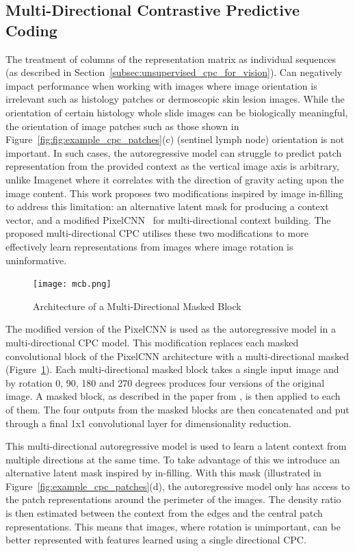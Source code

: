 \subsection{Multi-Directional Contrastive Predictive Coding}
\label{subsec:unsupervised_mdcpc}
The treatment of columns of the representation matrix as individual sequences (as described in Section~\ref{subsec:unsupervised_cpc_for_vision}). Can negatively impact performance when working with images where image orientation is irrelevant such as histology patches or dermoscopic skin lesion images. While the orientation of certain histology whole slide images can be biologically meaningful, the orientation of image patches such as those shown in Figure~\ref{fig:fig:example_cpc_patches}(c) (sentinel lymph node) orientation is not important. In such cases, the autoregressive model can struggle to predict patch representation from the provided context as the vertical image axis is arbitrary, unlike Imagenet where it correlates with the direction of gravity acting upon the image content. This work proposes two modifications inspired by image in-filling to address this limitation: an alternative latent mask for producing a context vector, and a modified PixelCNN~\citep{oord2016pixel} for multi-directional context building. The proposed multi-directional CPC utilises these two modifications to more effectively learn representations from images where image rotation is uninformative.

\begin{figure}
	\centering
	\texttt{[image: mcb.png]}
	\caption{Architecture of a Multi-Directional Masked Block}
	\label{fig:multi-directional_masked_block}
\end{figure}

The modified version of the PixelCNN is used as the autoregressive model in a multi-directional CPC model. This modification replaces each masked convolutional block of the PixelCNN architecture with a multi-directional masked (Figure~\ref{fig:multi-directional_masked_block}). Each multi-directional masked block takes a single input image and by rotation 0, 90, 180 and 270 degrees produces four versions of the original image. A masked block, as described in the paper from \cite{oord2016pixel}, is then applied to each of them. The four outputs from the masked blocks are then concatenated and put through a final 1x1 convolutional layer for dimensionality reduction.

This multi-directional autoregressive model is used to learn a latent context from multiple directions at the same time. To take advantage of this we introduce an alternative latent mask inspired by in-filling. With this mask (illustrated in Figure~\ref{fig:example_cpc_patches}(d), the autoregressive model only has access to the patch representations around the perimeter of the images. The density ratio is then estimated between the context from the edges and the central patch representations. This means that images, where rotation is unimportant, can be better represented with features learned using a single directional CPC.



